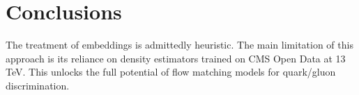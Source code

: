 \section{Conclusions}\label{sec:conclusions}

The treatment of embeddings is admittedly heuristic. The main limitation
of this approach is its reliance on density estimators trained on CMS
Open Data at 13 TeV. This unlocks the full potential of flow matching
models for quark/gluon discrimination.

